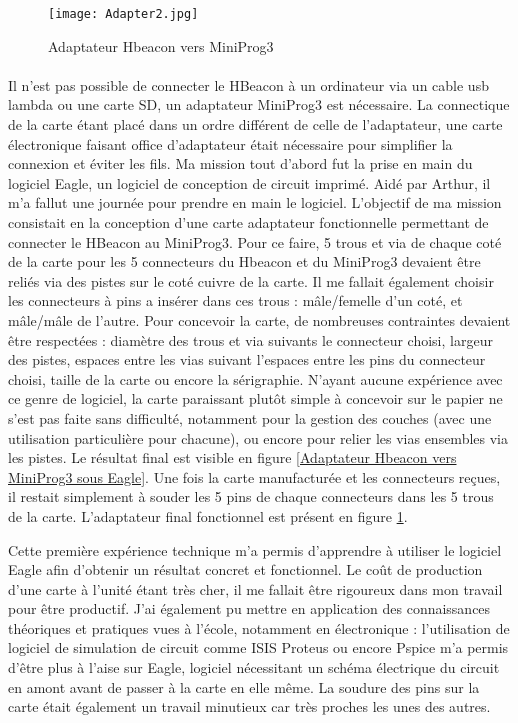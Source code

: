 \documentclass[12pt]{report}
\begin{document}
\begin{figure}[h!]
\begin{center}
\texttt{[image: Adapter2.jpg]}
\end{center}
\caption{Adaptateur Hbeacon vers MiniProg3}
\label{Adaptateur Hbeacon vers MiniProg3}
\end{figure}

\paragraph{}
Il n'est pas possible de connecter le HBeacon à un ordinateur via un cable usb lambda ou une carte SD, un adaptateur MiniProg3 est nécessaire. La connectique de la carte étant placé dans un ordre différent de celle de l'adaptateur, une carte électronique faisant office d'adaptateur était nécessaire pour simplifier la connexion et éviter les fils. 
Ma mission tout d'abord fut la prise en main du logiciel Eagle, un logiciel de conception de circuit imprimé. Aidé par Arthur, il m'a fallut une journée pour prendre en main le logiciel. 
L'objectif de ma mission consistait en la conception d'une carte adaptateur fonctionnelle permettant de connecter le HBeacon au MiniProg3. Pour ce faire, 5 trous et via de chaque coté de la carte pour les 5 connecteurs du Hbeacon et du MiniProg3 devaient être reliés via des pistes sur le coté cuivre de la carte. Il me fallait également choisir les connecteurs à pins a insérer dans ces trous : mâle/femelle d'un coté, et mâle/mâle de l'autre. Pour concevoir la carte, de nombreuses contraintes devaient être respectées : diamètre des trous et via suivants le connecteur choisi, largeur des pistes, espaces entre les vias suivant l'espaces entre les pins du connecteur choisi, taille de la carte ou encore la sérigraphie. N'ayant aucune expérience avec ce genre de logiciel, la carte paraissant plutôt simple à concevoir sur le papier ne s'est pas faite sans difficulté, notamment pour la gestion des couches (avec une utilisation particulière pour chacune), ou encore pour relier les vias ensembles via les pistes. Le résultat final est visible en figure \ref{Adaptateur Hbeacon vers MiniProg3 sous Eagle}. 
Une fois la carte manufacturée et les connecteurs reçues, il restait simplement à souder les 5 pins de chaque connecteurs dans les 5 trous de la carte. L'adaptateur final fonctionnel est présent en figure \ref{Adaptateur Hbeacon vers MiniProg3}.

Cette première expérience technique m'a permis d'apprendre à utiliser le logiciel Eagle afin d'obtenir un résultat concret et fonctionnel. Le coût de production d'une carte à l'unité étant très cher, il me fallait être rigoureux dans mon travail pour être productif. J'ai également pu mettre en application des connaissances théoriques et pratiques vues à l'école, notamment en électronique : l'utilisation de logiciel de simulation de circuit comme ISIS Proteus ou encore Pspice m'a permis d'être plus à l'aise sur Eagle, logiciel nécessitant un schéma électrique du circuit en amont avant de passer à la carte en elle même. La soudure des pins sur la carte était également un travail minutieux car très proches les unes des autres. 
\end{document}
